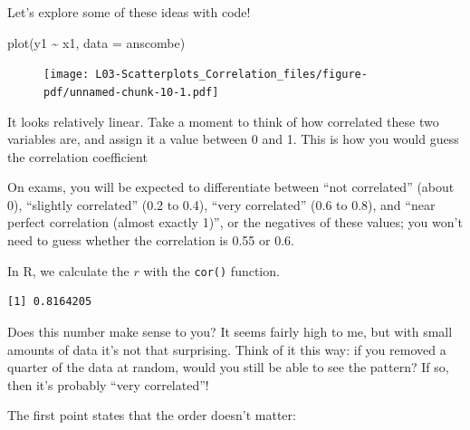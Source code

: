 \documentclass[
  letterpaper,
  DIV=11,
  numbers=noendperiod,
  oneside]{scrreprt}
\newenvironment{Shaded}{\begin{snugshade}}{\end{snugshade}}
\newcommand{\AttributeTok}[1]{\textcolor[rgb]{0.40,0.45,0.13}{#1}}
\newcommand{\FunctionTok}[1]{\textcolor[rgb]{0.28,0.35,0.67}{#1}}
\newcommand{\NormalTok}[1]{\textcolor[rgb]{0.00,0.23,0.31}{#1}}
\newcommand{\SpecialCharTok}[1]{\textcolor[rgb]{0.37,0.37,0.37}{#1}}
\begin{document}
Let's explore some of these ideas with code!

\begin{Shaded}
\begin{Highlighting}[]
\FunctionTok{plot}\NormalTok{(y1 }\SpecialCharTok{\textasciitilde{}}\NormalTok{ x1, }\AttributeTok{data =}\NormalTok{ anscombe)}
\end{Highlighting}
\end{Shaded}

\begin{figure}[H]

{\centering \texttt{[image: L03-Scatterplots\_Correlation\_files/figure-pdf/unnamed-chunk-10-1.pdf]}

}

\end{figure}

It looks relatively linear. Take a moment to think of how correlated
these two variables are, and assign it a value between 0 and 1. This is
how you would guess the correlation coefficient

On exams, you will be expected to differentiate between ``not
correlated'' (about 0), ``slightly correlated'' (0.2 to 0.4), ``very
correlated'' (0.6 to 0.8), and ``near perfect correlation (almost
exactly 1)'', or the negatives of these values; you won't need to guess
whether the correlation is 0.55 or 0.6.

In R, we calculate the \(r\) with the \texttt{cor()} function.

\begin{Shaded}
\end{Shaded}

\begin{verbatim}
[1] 0.8164205
\end{verbatim}

Does this number make sense to you? It seems fairly high to me, but with
small amounts of data it's not that surprising. Think of it this way: if
you removed a quarter of the data at random, would you still be able to
see the pattern? If so, then it's probably ``very correlated''!

The first point states that the order doesn't matter:

\begin{Shaded}
\end{Shaded}
\end{document}
